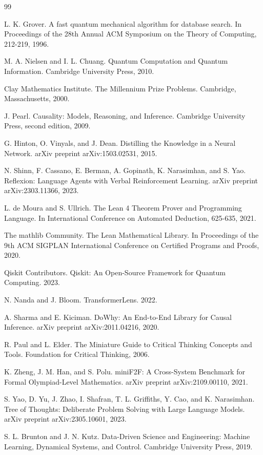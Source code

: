 \begin{thebibliography}{99}

L. K. Grover. A fast quantum mechanical algorithm for database search. In Proceedings of the 28th Annual ACM Symposium on the Theory of Computing, 212-219, 1996.

M. A. Nielsen and I. L. Chuang. Quantum Computation and Quantum Information. Cambridge University Press, 2010.

Clay Mathematics Institute. The Millennium Prize Problems. Cambridge, Massachusetts, 2000.

J. Pearl. Causality: Models, Reasoning, and Inference. Cambridge University Press, second edition, 2009.

G. Hinton, O. Vinyals, and J. Dean. Distilling the Knowledge in a Neural Network. arXiv preprint arXiv:1503.02531, 2015.

N. Shinn, F. Cassano, E. Berman, A. Gopinath, K. Narasimhan, and S. Yao. Reflexion: Language Agents with Verbal Reinforcement Learning. arXiv preprint arXiv:2303.11366, 2023.

L. de Moura and S. Ullrich. The Lean 4 Theorem Prover and Programming Language. In International Conference on Automated Deduction, 625-635, 2021.

The mathlib Community. The Lean Mathematical Library. In Proceedings of the 9th ACM SIGPLAN International Conference on Certified Programs and Proofs, 2020.

Qiskit Contributors. Qiskit: An Open-Source Framework for Quantum Computing. 2023.

N. Nanda and J. Bloom. TransformerLens. 2022.

A. Sharma and E. Kiciman. DoWhy: An End-to-End Library for Causal Inference. arXiv preprint arXiv:2011.04216, 2020.

R. Paul and L. Elder. The Miniature Guide to Critical Thinking Concepts and Tools. Foundation for Critical Thinking, 2006.

K. Zheng, J. M. Han, and S. Polu. miniF2F: A Cross-System Benchmark for Formal Olympiad-Level Mathematics. arXiv preprint arXiv:2109.00110, 2021.

S. Yao, D. Yu, J. Zhao, I. Shafran, T. L. Griffiths, Y. Cao, and K. Narasimhan. Tree of Thoughts: Deliberate Problem Solving with Large Language Models. arXiv preprint arXiv:2305.10601, 2023.

S. L. Brunton and J. N. Kutz. Data-Driven Science and Engineering: Machine Learning, Dynamical Systems, and Control. Cambridge University Press, 2019.

\end{thebibliography}
